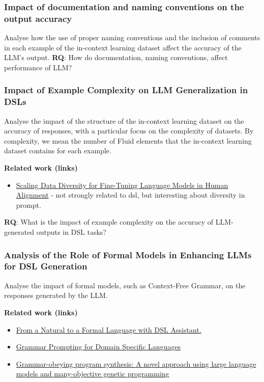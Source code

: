 \subsubsection{Impact of documentation and naming conventions on the output accuracy}
Analyse how the use of proper naming conventions and the inclusion of comments in each example of the
in-context learning dataset affect the accuracy of the LLM's output. \textbf{RQ}: How do documentation, naming
conventions, affect performance of LLM?

\subsubsection{Impact of Example Complexity on LLM Generalization in DSLs}
Analyse the impact of the structure of the in-context learning dataset on the accuracy of responses, with a particular focus on the complexity of datasets.
By complexity, we mean the number of Fluid elements that the in-context learning dataset contains for each example.


\textbf{Related work (links)}
\begin{itemize}
    \item \href{http://www.lrec-conf.org/proceedings/lrec-coling-2024/pdf/2024.main-1.1251.pdf}{Scaling Data Diversity for Fine-Tuning Language Models in Human Alignment} - not strongly related to dsl, but interesting about diversity in prompt.
\end{itemize}

\textbf{RQ}: What is the impact of example complexity on the accuracy of LLM-generated outputs in DSL tasks?

\subsubsection{Analysis of the Role of Formal Models in Enhancing LLMs for DSL Generation}

Analyse the impact of formal models, such as Context-Free Grammar, on the responses generated by the LLM.

\textbf{Related work (links)}
\begin{itemize}
    \item \href{https://dl.acm.org/doi/10.1145/3652620.3687811}{From a Natural to a Formal Language with DSL Assistant.}
    \item \href{https://proceedings.neurips.cc/paper_files/paper/2023/file/cd40d0d65bfebb894ccc9ea822b47fa8-Paper-Conference.pdf}{Grammar Prompting for Domain Specific Languages}
    \item \href{https://www.sciencedirect.com/science/article/abs/pii/S0920548924001077}{Grammar-obeying program synthesis: A novel approach using large language models and many-objective genetic programming}
\end{itemize}

